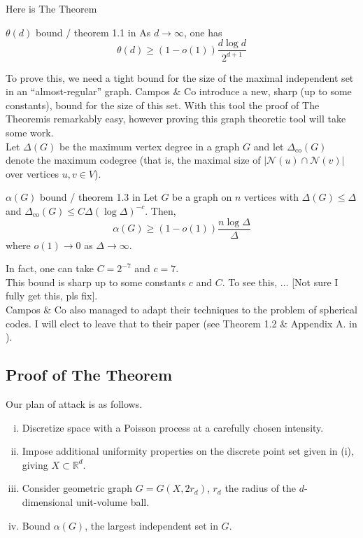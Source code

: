 \documentclass{article}
\begin{document}
Here is The Theorem\texttrademark

\begin{theorem}[]{$\theta(d)$ bound / theorem 1.1 in \cite{campos2023}}
    As $d \to \infty$, one has \[\theta(d) \geq (1 - o(1))\frac{d\log d}{2^{d+1}}\] 
\end{theorem}

To prove this, we need a tight bound for the size of the maximal independent set in an ``almost-regular'' graph. 
Campos $\&$ Co introduce a new, sharp (up to some constants), bound for the size of this set. With this tool the 
proof of The Theorem\texttrademark is remarkably easy, however proving this graph theoretic tool will take some 
work. \\

Let $\Delta(G)$ be the maximum vertex degree in a graph $G$ and let $\Delta_\text{co}(G)$ denote the maximum 
codegree (that is, the maximal size of $|\mathcal{N}(u)\cap \mathcal{N}(v)|$ over vertices $u, v \in V$).

\begin{theorem}[]{$\alpha(G)$ bound / theorem 1.3 in \cite{campos2023}}
    Let $G$ be a graph on $n$ vertices with $\Delta(G) \leq \Delta$ and $\Delta_\text{co}(G) \leq C\Delta (\log \Delta)^{-c}$. 
    Then, \[\alpha(G) \geq (1 - o(1))\frac{n \log \Delta}{\Delta}\] where $o(1) \to 0$ as $\Delta \to \infty$.
\end{theorem}

In fact, one can take $C = 2^{-7}$ and $c = 7$. \\

This bound is sharp up to some constants $c$ and $C$. To see this, $\dots$ [Not sure I fully get this, pls fix]. \\

Campos $\&$ Co also managed to adapt their techniques to the problem of spherical codes. I will elect to leave that 
to their paper (see Theorem 1.2 $\&$ Appendix A. in \cite{campos2023}).

\subsection{Proof of The Theorem\texttrademark}

Our plan of attack is as follows. 
\begin{enumerate}[(i)]
    \item Discretize space with a Poisson process at a carefully chosen intensity.
    \item Impose additional uniformity properties on the discrete point set given in (i), giving $X \subset \mathbb{R}^d$.
    \item Consider geometric graph $G = G(X, 2r_d)$, $r_d$ the radius of the $d$-dimensional unit-volume ball.
    \item Bound $\alpha(G)$, the largest independent set in $G$. 
\end{enumerate}
\end{document}
